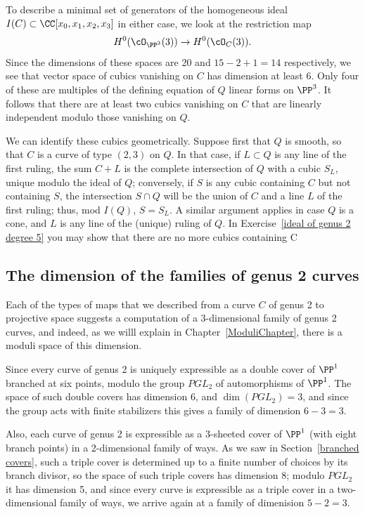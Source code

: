 To describe a minimal set of generators of the homogeneous ideal $I(C) \subset \CC[x_0, x_1, x_2, x_3]$ in either case, we look at the restriction map
$$
H^0(\cO_{\PP^3}(3)) \to H^0(\cO_C(3)).
$$
Since the dimensions of these spaces are 20 and $15-2+1 = 14$ respectively, we see that  vector space of cubics vanishing on $C$ has dimension at least 6. Only four of these are multiples of the defining equation of $Q$ linear forms on $\PP^3$. It follows that there are at least two cubics vanishing on $C$ that are linearly independent modulo those vanishing on $Q$.

We can identify these cubics geometrically. Suppose first that $Q$ is smooth, so that $C$ is a curve of type $(2,3)$ on $Q$. In that case, if $L \subset Q$ is any line of the first ruling, the sum $C+L$ is the complete intersection of $Q$ with a cubic $S_L$, unique modulo the ideal of $Q$; conversely, if $S$ is any cubic containing $C$ but not containing $S$, the intersection $S \cap Q$ will be the union of $C$ and a line $L$ of the first ruling; thus, mod $I(Q)$, $S = S_L$. A similar argument applies in case $Q$ is a cone, and $L$ is any line of the (unique) ruling of $Q$. In Exercise~\ref{ideal of genus 2 degree 5} you may show that there are no more cubics containing C

\subsection{The dimension of the families of genus 2 curves}

Each of the types of maps that we described from a curve $C$ of genus 2 to projective space suggests
a computation of a 3-dimensional family of genus 2 curves, and indeed, as we willl explain in Chapter~\ref{ModuliChapter}, there is a moduli space of this dimension.

Since every curve of genus 2 is uniquely expressible as a double cover of $\PP^1$ branched at six points, modulo the group $PGL_2$ of automorphisms of $\PP^1$. The space of such double covers has dimension 6, and $\dim(PGL_2) = 3$, and since the group acts with finite stabilizers this gives a family of dimension $6-3 = 3$.

Also, each curve  of genus 2 is expressible as a 3-sheeted cover of $\PP^1$ (with eight branch points) in a 2-dimensional family of ways. As we saw in Section~\ref{branched covers}, such a triple cover is determined up to a finite number of choices by its branch divisor, so the space of such triple covers has dimension 8; modulo $PGL_2$ it has dimension 5, and since every curve is expressible as a triple cover in a two-dimensional family of ways, we arrive again at a family of dimenision $ 5-2 = 3$.

